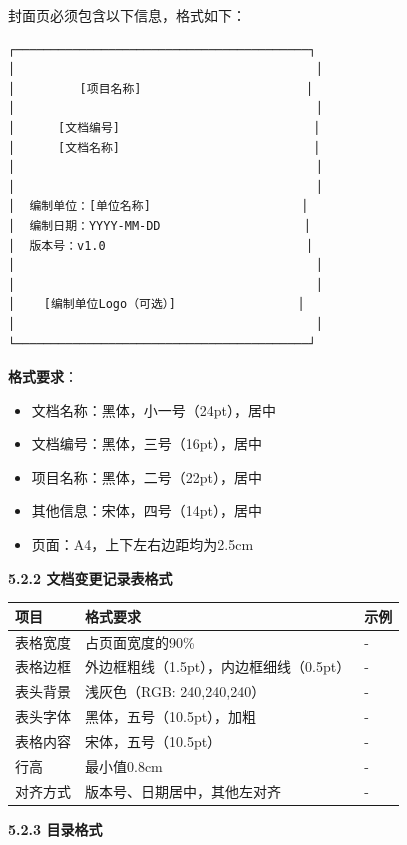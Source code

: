 \documentclass[12pt,a4paper]{article}
\numberwithin{equation}{section}  %
\begin{document}
封面页必须包含以下信息，格式如下：

\begin{verbatim}
┌─────────────────────────────────────────┐
│                                          │
│         [项目名称]                       │
│                                          │
│      [文档编号]                           │
│      [文档名称]                           │
│                                          │
│                                          │
│  编制单位：[单位名称]                     │
│  编制日期：YYYY-MM-DD                    │
│  版本号：v1.0                            │
│                                          │
│                                          │
│    [编制单位Logo（可选）]                 │
│                                          │
└─────────────────────────────────────────┘
\end{verbatim}

\textbf{格式要求}：
\begin{itemize}
\item 文档名称：黑体，小一号（24pt），居中
\item 文档编号：黑体，三号（16pt），居中
\item 项目名称：黑体，二号（22pt），居中
\item 其他信息：宋体，四号（14pt），居中
\item 页面：A4，上下左右边距均为2.5cm
\end{itemize}

\textbf{5.2.2 文档变更记录表格式}

\begin{longtable}{|p{4cm}|p{5cm}|p{5cm}|}
\hline
项目 & 格式要求 & 示例 \\
\hline
表格宽度 & 占页面宽度的90\% & - \\
表格边框 & 外边框粗线（1.5pt），内边框细线（0.5pt） & - \\
表头背景 & 浅灰色（RGB: 240,240,240） & - \\
表头字体 & 黑体，五号（10.5pt），加粗 & - \\
表格内容 & 宋体，五号（10.5pt） & - \\
行高 & 最小值0.8cm & - \\
对齐方式 & 版本号、日期居中，其他左对齐 & - \\
\hline
\end{longtable}

\textbf{5.2.3 目录格式}
\end{document}
